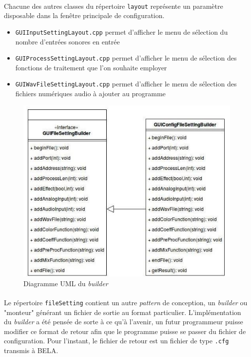  \paragraph{}
 Chacune des autres classes du répertoire \verb!layout! représente un
 paramètre disposable dans la fenêtre principale de configuration.
 \begin{itemize}
  \item \verb!GUIInputSettingLayout.cpp! permet d'afficher le menu de sélection du nombre d'entrées sonores en entrée
  \item \verb!GUIProcessSettingLayout.cpp! permet d'afficher le menu de sélection des fonctions de traitement que l'on souhaite employer
  \item \verb!GUIWavFileSettingLayout.cpp! permet d'afficher le menu de sélection des fichiers numériques audio à ajouter au programme
 \end{itemize}


 \begin{figure}[H]
  \centering
  \includegraphics[scale=0.5]{assets/umlBuilder.png}
  \caption{Diagramme UML du \textit{builder}}
  \label{schéma global}
 \end{figure}

 \paragraph{}
 Le répertoire \verb!fileSetting! contient un autre \textit{pattern} de
 conception, un \textit{builder} ou "monteur" générant un fichier de sortie au
 format particulier. L'implémentation du \textit{builder} a été pensée de
 sorte à ce qu'à l'avenir, un futur programmeur puisse modifier ce format de
 retour afin que le programme puisse se passer du fichier de configuration.
 Pour l'instant, le fichier de retour est un fichier de type \verb!.cfg! transmis à BELA.

